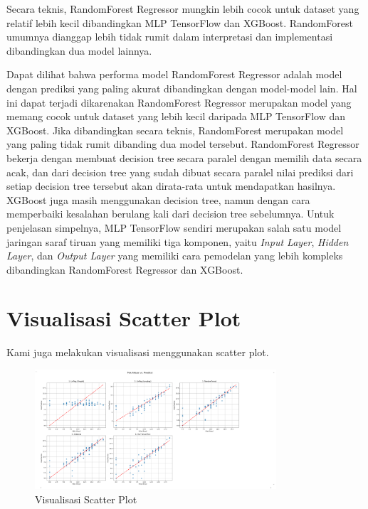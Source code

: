 Secara teknis, RandomForest Regressor mungkin lebih cocok untuk dataset yang relatif lebih kecil dibandingkan MLP TensorFlow dan XGBoost. 
RandomForest umumnya dianggap lebih tidak rumit dalam interpretasi dan implementasi dibandingkan dua model lainnya.

Dapat dilihat bahwa performa model RandomForest Regressor adalah model dengan prediksi yang paling akurat dibandingkan dengan model-model lain. 
Hal ini dapat terjadi dikarenakan RandomForest Regressor merupakan model yang memang cocok untuk dataset yang lebih kecil daripada MLP TensorFlow 
dan XGBoost. Jika dibandingkan secara teknis, RandomForest merupakan model yang paling tidak rumit dibanding dua model tersebut. RandomForest 
Regressor bekerja dengan membuat decision tree secara paralel dengan memilih data secara acak, dan dari decision tree yang sudah dibuat secara 
paralel nilai prediksi dari setiap decision tree tersebut akan dirata-rata untuk mendapatkan hasilnya. XGBoost juga masih menggunakan decision 
tree, namun dengan cara memperbaiki kesalahan berulang kali dari decision tree sebelumnya. Untuk penjelasan simpelnya, MLP TensorFlow sendiri 
merupakan salah satu model jaringan saraf tiruan yang memiliki tiga komponen, yaitu \textit{Input Layer}, \textit{Hidden Layer}, 
dan \textit{Output Layer} yang memiliki cara pemodelan yang lebih kompleks dibandingkan RandomForest Regressor dan XGBoost.

\section{Visualisasi Scatter Plot}

Kami juga melakukan visualisasi menggunakan scatter plot.

\begin{figure}[h]
    \centering
    \includegraphics[width=0.8\textwidth]{images/scatter_plot.png}
    \caption{Visualisasi Scatter Plot}
    \label{fig:scatter}
\end{figure}

